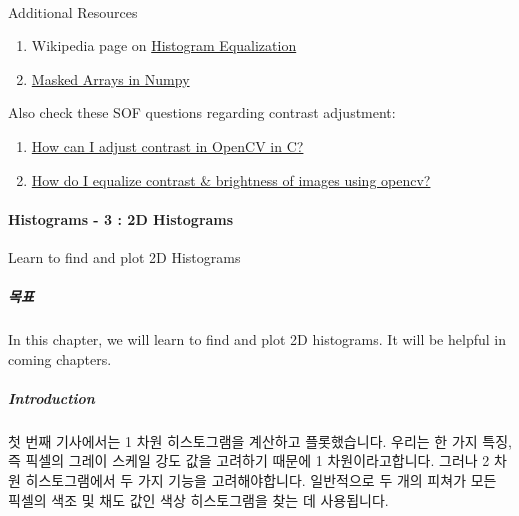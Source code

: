 \documentclass[11pt]{article}
\providecommand{\tightlist}{%
      \setlength{\itemsep}{0pt}\setlength{\parskip}{0pt}}
\begin{document}
    \begin{center}
    \end{center}
    { \hspace*{\fill} \\}
    
    Additional Resources

\begin{enumerate}
\def\labelenumi{\arabic{enumi}.}
\tightlist
\item
  Wikipedia page on
  \href{https://en.wikipedia.org/wiki/Histogram_equalization}{Histogram
  Equalization}
\item
  \href{https://docs.scipy.org/doc/numpy/reference/maskedarray.html}{Masked
  Arrays in Numpy}
\end{enumerate}

Also check these SOF questions regarding contrast adjustment:

\begin{enumerate}
\def\labelenumi{\arabic{enumi}.}
\setcounter{enumi}{2}
\tightlist
\item
  \href{https://stackoverflow.com/questions/10549245/how-can-i-adjust-contrast-in-opencv-in-c}{How
  can I adjust contrast in OpenCV in C?}
\item
  \href{https://stackoverflow.com/questions/10561222/how-do-i-equalize-contrast-brightness-of-images-using-opencv}{How
  do I equalize contrast \& brightness of images using opencv?}
\end{enumerate}

    \hypertarget{histograms---3-2d-histograms}{%
\paragraph{Histograms - 3 : 2D
Histograms}\label{histograms---3-2d-histograms}}

Learn to find and plot 2D Histograms

\hypertarget{uxbaa9uxd45c}{%
\subparagraph{목표}\label{uxbaa9uxd45c}}

In this chapter, we will learn to find and plot 2D histograms. It will
be helpful in coming chapters.

\hypertarget{introduction}{%
\subparagraph{Introduction}\label{introduction}}

첫 번째 기사에서는 1 차원 히스토그램을 계산하고 플롯했습니다. 우리는 한
가지 특징, 즉 픽셀의 그레이 스케일 강도 값을 고려하기 때문에 1
차원이라고합니다. 그러나 2 차원 히스토그램에서 두 가지 기능을
고려해야합니다. 일반적으로 두 개의 피쳐가 모든 픽셀의 색조 및 채도 값인
색상 히스토그램을 찾는 데 사용됩니다.
\end{document}
